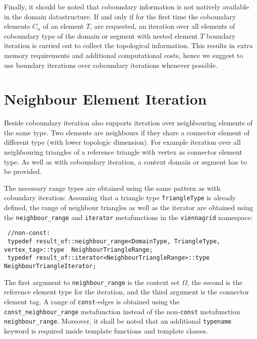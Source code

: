 Finally, it should be noted that coboundary information is not natively available in the domain datastructure. If and only if for the first time
the coboundary elements $C_n$ of an element $T$, are requested, an iteration over all elements of coboundary type of the domain or segment with nested element $T$ boundary iteration is carried out to collect the topological information.
This results in extra memory requirements and additional computational costs, hence we suggest to use boundary iterations over coboundary iterations whenever possible.



\section{Neighbour Element Iteration}
Beside coboundary iteration {\ViennaGridversion} also supports iteration over neighbouring elements of the same type. Two elements are neighbours if they share a connector element of different type (with lower topologic dimension). For example iteration over all neighbouring triangles of a reference triangle with vertex as connector element type. As well as with coboundary iteration, a context domain or segment has to be provided.


The necessary range types are obtained using the same pattern as with cobundary iteration:
Assuming that a triangle type \lstinline|TriangleType| is already defined, the range of neighbour triangles as well as the iterator are obtained
using the \lstinline|neighbour_range| and \lstinline|iterator| metafunctions in the \lstinline|viennagrid| namespace:
\begin{lstlisting}
 //non-const:
 typedef result_of::neighbour_range<DomainType, TriangleType, vertex_tag>::type  NeighbourTriangleRange;
 typedef result_of::iterator<NeighbourTriangleRange>::type NeighbourTriangleIterator;
\end{lstlisting}
The first argument to \lstinline|neighbour_range| is the context set $\Omega$, the second is the reference element type for the iteration, and the third argument is the connector element tag.
A range of \lstinline|const|-edges is obtained using the \lstinline|const_neighbour_range| metafunction instead of the non-\lstinline|const| metafunction \lstinline|neighbour_range|.
Moreover, it shall be noted that an additional \lstinline|typename| keyword is required inside template functions and template classes.

